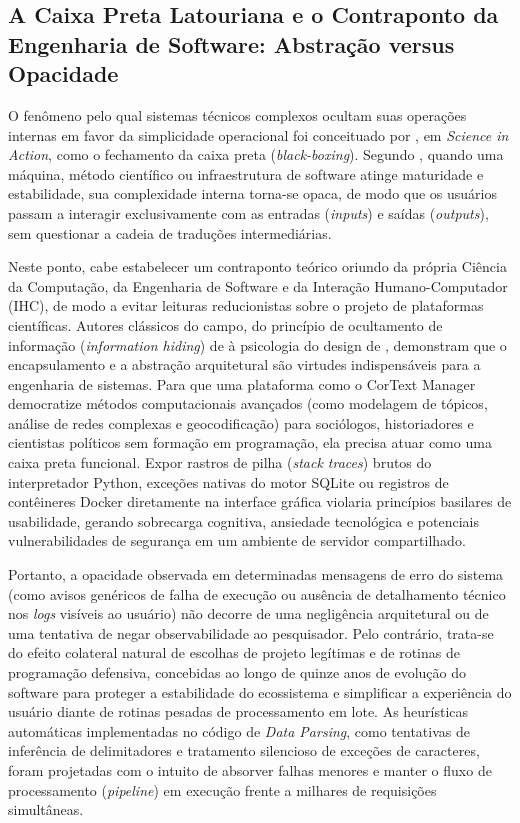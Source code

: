\documentclass[
	oneside,
	a4paper,
	12pt,
	chapter=TITLE,
	section=TITLE,
	english,
	brazilian
]{abntex2}
\begin{document}
\FloatBarrier
\subsection{A Caixa Preta Latouriana e o Contraponto da Engenharia de Software: Abstração versus Opacidade}\label{sec:a_caixa_preta_latouriana_e_o_contraponto}


O fenômeno pelo qual sistemas técnicos complexos ocultam suas operações internas em favor da simplicidade operacional foi conceituado por , em \textit{Science in Action}, como o fechamento da caixa preta (\textit{black-boxing}). Segundo , quando uma máquina, método científico ou infraestrutura de software atinge maturidade e estabilidade, sua complexidade interna torna-se opaca, de modo que os usuários passam a interagir exclusivamente com as entradas (\textit{inputs}) e saídas (\textit{outputs}), sem questionar a cadeia de traduções intermediárias.

Neste ponto, cabe estabelecer um contraponto teórico oriundo da própria Ciência da Computação, da Engenharia de Software e da Interação Humano-Computador (IHC), de modo a evitar leituras reducionistas sobre o projeto de plataformas científicas. Autores clássicos do campo, do princípio de ocultamento de informação (\textit{information hiding}) de  à psicologia do design de , demonstram que o encapsulamento e a abstração arquitetural são virtudes indispensáveis para a engenharia de sistemas. Para que uma plataforma como o CorText Manager democratize métodos computacionais avançados (como modelagem de tópicos, análise de redes complexas e geocodificação) para sociólogos, historiadores e cientistas políticos sem formação em programação, ela precisa atuar como uma caixa preta funcional. Expor rastros de pilha (\textit{stack traces}) brutos do interpretador Python, exceções nativas do motor SQLite ou registros de contêineres Docker diretamente na interface gráfica violaria princípios basilares de usabilidade, gerando sobrecarga cognitiva, ansiedade tecnológica e potenciais vulnerabilidades de segurança em um ambiente de servidor compartilhado.

Portanto, a opacidade observada em determinadas mensagens de erro do sistema (como avisos genéricos de falha de execução ou ausência de detalhamento técnico nos \textit{logs} visíveis ao usuário) não decorre de uma negligência arquitetural ou de uma tentativa de negar observabilidade ao pesquisador. Pelo contrário, trata-se do efeito colateral natural de escolhas de projeto legítimas e de rotinas de programação defensiva, concebidas ao longo de quinze anos de evolução do software para proteger a estabilidade do ecossistema e simplificar a experiência do usuário diante de rotinas pesadas de processamento em lote. As heurísticas automáticas implementadas no código de \textit{Data Parsing}, como tentativas de inferência de delimitadores e tratamento silencioso de exceções de caracteres, foram projetadas com o intuito de absorver falhas menores e manter o fluxo de processamento (\textit{pipeline}) em execução frente a milhares de requisições simultâneas.
\end{document}
